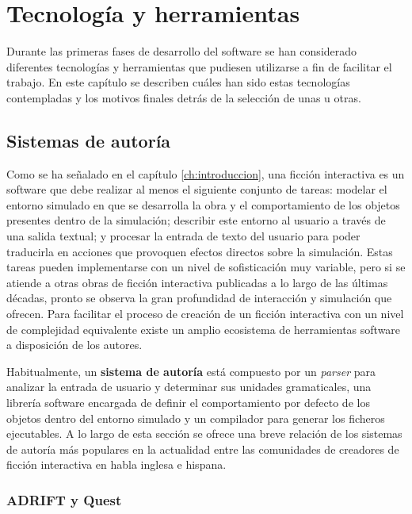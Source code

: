 
\chapter{Tecnología y herramientas}\label{ch:herramientas}

Durante las primeras fases de desarrollo del software se han considerado diferentes tecnologías y herramientas que pudiesen utilizarse a fin de facilitar el trabajo. En este capítulo se describen cuáles han sido estas tecnologías contempladas y los motivos finales detrás de la selección de unas u otras.


\section{Sistemas de autoría}\label{sec:sistemas-autoria}

Como se ha señalado en el capítulo \ref{ch:introduccion}, una ficción interactiva es un software que debe realizar al menos el siguiente conjunto de tareas: modelar el entorno simulado en que se desarrolla la obra y el comportamiento de los objetos presentes dentro de la simulación; describir este entorno al usuario a través de una salida textual; y procesar la entrada de texto del usuario para poder traducirla en acciones que provoquen efectos directos sobre la simulación. Estas tareas pueden implementarse con un nivel de sofisticación muy variable, pero si se atiende a otras obras de ficción interactiva publicadas a lo largo de las últimas décadas, pronto se observa la gran profundidad de interacción y simulación que ofrecen. Para facilitar el proceso de creación de un ficción interactiva con un nivel de complejidad equivalente existe un amplio ecosistema de herramientas software a disposición de los autores.

Habitualmente, un \textbf{sistema de autoría} está compuesto por un \emph{parser} para analizar la entrada de usuario y determinar sus unidades gramaticales, una librería software encargada de definir el comportamiento por defecto de los objetos dentro del entorno simulado y un compilador para generar los ficheros ejecutables. A lo largo de esta sección se ofrece una breve relación de los sistemas de autoría más populares en la actualidad entre las comunidades de creadores de ficción interactiva en habla inglesa e hispana.

\subsection{ADRIFT y Quest}

